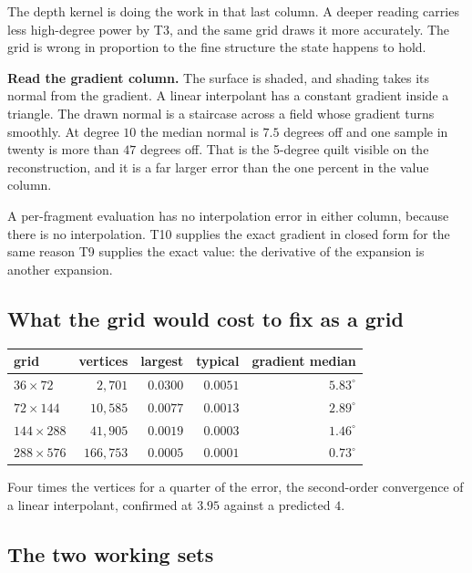 The depth kernel is doing the work in that last column. A deeper reading carries less high-degree power by T3, and the same grid draws it more accurately. The grid is wrong in proportion to the fine structure the state happens to hold.

\textbf{Read the gradient column.} The surface is shaded, and shading takes its normal from the gradient. A linear interpolant has a constant gradient inside a triangle. The drawn normal is a staircase across a field whose gradient turns smoothly. At degree \(10\) the median normal is \(7.5\) degrees off and one sample in twenty is more than \(47\) degrees off. That is the 5-degree quilt visible on the reconstruction, and it is a far larger error than the one percent in the value column.

A per-fragment evaluation has no interpolation error in either column, because there is no interpolation. T10 supplies the exact gradient in closed form for the same reason T9 supplies the exact value: the derivative of the expansion is another expansion.

\subsection{What the grid would cost to fix as a grid}

\begin{center}
\begin{tabular}{@{}lrrrr@{}}
\toprule
grid & vertices & largest & typical & gradient median \\
\midrule
\(36 \times 72\) & \(2{,}701\) & \(0.0300\) & \(0.0051\) & \(5.83^\circ\) \\
\(72 \times 144\) & \(10{,}585\) & \(0.0077\) & \(0.0013\) & \(2.89^\circ\) \\
\(144 \times 288\) & \(41{,}905\) & \(0.0019\) & \(0.0003\) & \(1.46^\circ\) \\
\(288 \times 576\) & \(166{,}753\) & \(0.0005\) & \(0.0001\) & \(0.73^\circ\) \\
\bottomrule
\end{tabular}
\end{center}

Four times the vertices for a quarter of the error, the second-order convergence of a linear interpolant, confirmed at \(3.95\) against a predicted \(4\).

\subsection{The two working sets}

